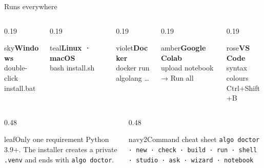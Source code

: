 \documentclass[aspectratio=169,11pt]{beamer}
\newcommand{\plat}[3]{\begin{tile}{#1}{\bfseries\small #2}\\[1mm]{\ttfamily\scriptsize #3}\end{tile}}
\begin{document}
\begin{frame}{Runs everywhere}
\vspace{2mm}
\begin{columns}[T]
\begin{column}{0.19\textwidth}\plat{sky}{Windows}{double-click\\install.bat}\end{column}
\begin{column}{0.19\textwidth}\plat{teal}{Linux · macOS}{bash install.sh}\end{column}
\begin{column}{0.19\textwidth}\plat{violet}{Docker}{docker run\\algolang \dots}\end{column}
\begin{column}{0.19\textwidth}\plat{amber}{Google Colab}{upload notebook\\→ Run all}\end{column}
\begin{column}{0.19\textwidth}\plat{rose}{VS Code}{syntax colours\\Ctrl+Shift+B}\end{column}
\end{columns}
\vspace{3mm}
\begin{columns}[T]
\begin{column}{0.48\textwidth}
\begin{card}{leaf}{Only one requirement}
Python 3.9+. The installer creates a private \texttt{.venv} and ends with \texttt{algo doctor}.
\end{card}
\end{column}
\begin{column}{0.48\textwidth}
\begin{card}{navy2}{Command cheat sheet}
\texttt{algo doctor · new · check · build · run · shell · studio · ask · wizard · notebook}
\end{card}
\end{column}
\end{columns}
\end{frame}

\end{document}
